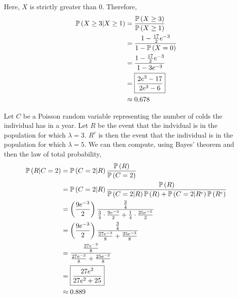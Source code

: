 \documentclass{article}
\begin{document}
\subproblema{}
Here, $X$ is strictly greater than $0$.
Therefore,
\begin{align*}
  \mathbb{P} \left ( X \geq 3 \vert X \geq 1 \right) &= \frac{\mathbb{P} \left ( X \geq 3 \right)}{\mathbb{P} \left ( X \geq 1 \right)} \\
                               &= \frac{1 - \frac{17}{2} e^{-3}}{1 - \mathbb{P} \left ( X = 0 \right)} \\
                               &= \frac{1 - \frac{17}{2} e^{-3}}{1 - 3 e^{-3}} \\
                               &= \boxed{\frac{2e^3 - 17}{2e^3 - 6}} \\
                               &\approx 0.678 \\
\end{align*}


\setcounter{problem}{62}
\problem{}
Let $C$ be a Poisson random variable representing the number of colds the individual has in a year.
Let $R$ be the event that the indvidual is in the population for which $\lambda = 3$.
$R^c$ is then the event that the individual is in the population for which $\lambda = 5$.
We can then compute,
using Bayes' theorem and then the law of total probability,
\begin{align*}
  \mathbb{P} \left ( R \vert C = 2 \right) &= \mathbb{P} \left ( C = 2 \vert R \right) \frac{\mathbb{P} \left ( R \right)}{\mathbb{P} \left ( C = 2 \right)} \\
                     &= \mathbb{P} \left ( C = 2 \vert R \right) \frac{\mathbb{P} \left ( R \right)}{\mathbb{P} \left ( C = 2 \vert R \right) \mathbb{P} \left ( R \right) + \mathbb{P} \left ( C = 2 \vert R^c \right) \mathbb{P} \left ( R^c \right)} \\
                     &= \left (\frac{9 e^{-3}}{2} \right) \frac{\frac{3}{4}}{\frac{3}{4} \cdot \frac{9 e^{-3}}{2} + \frac{1}{4} \cdot \frac{25 e^{-5}}{2} } \\
                     &= \left (\frac{9 e^{-3}}{2} \right) \frac{\frac{3}{4}}{\frac{27e^{-3}}{8} + \frac{25e^{-5}}{8}} \\
                     &= \frac{\frac{27e^{-3}}{8}}{\frac{27e^{-3}}{8} + \frac{25e^{-5}}{8}} \\
                     &= \boxed{\frac{27e^{2}}{27 e^{2} + 25}} \\
                     &\approx 0.889
\end{align*}
\end{document}
